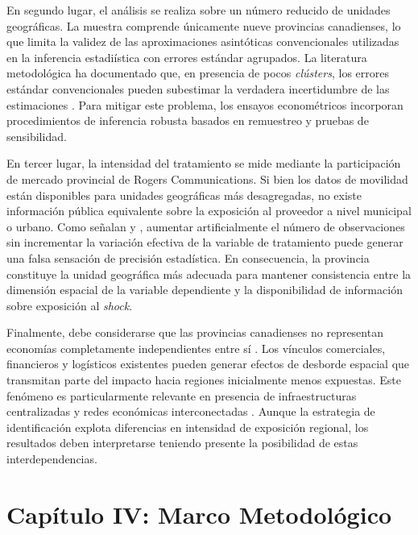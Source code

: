 En segundo lugar, el an\'alisis se realiza sobre un n\'umero reducido de unidades 
geogr\'aficas. La muestra comprende \'unicamente nueve provincias canadienses, lo 
que limita la validez de las aproximaciones asint\'oticas convencionales 
utilizadas en la inferencia estadi\'istica con errores est\'andar agrupados. La 
literatura metodol\'ogica ha documentado que, en presencia de pocos 
\textit{cl\'usters}, los errores est\'andar convencionales pueden subestimar la 
verdadera incertidumbre de las estimaciones \citep{cameron2006robust, ferman2019inference, mackinnon2020randomization}. Para mitigar este problema, los ensayos econom\'etricos incorporan procedimientos de inferencia robusta basados en remuestreo y pruebas de sensibilidad.

En tercer lugar, la intensidad del tratamiento se mide mediante la 
participaci\'on de mercado provincial de Rogers Communications. Si bien los 
datos de movilidad est\'an disponibles para unidades geogr\'aficas m\'as 
desagregadas, no existe informaci\'on p\'ublica equivalente sobre la exposici\'on 
al proveedor a nivel municipal o urbano. Como se\~nalan \cite{moulton1990aggregate} y 
\cite{angrist2009mostly}, aumentar artificialmente el n\'umero de observaciones sin 
incrementar la variaci\'on efectiva de la variable de tratamiento puede generar 
una falsa sensaci\'on de precisi\'on estad\'istica. En consecuencia, la 
provincia constituye la unidad geogr\'afica m\'as adecuada para mantener 
consistencia entre la dimensi\'on espacial de la variable dependiente y la 
disponibilidad de informaci\'on sobre exposici\'on al \textit{shock}.

Finalmente, debe considerarse que las provincias canadienses no representan 
econom\'ias completamente independientes entre s\'i \citep{jackson2010social}. Los v\'inculos comerciales, financieros y log\'isticos existentes pueden generar efectos de desborde espacial que transmitan parte del impacto hacia regiones inicialmente menos expuestas. Este fen\'omeno es particularmente relevante en presencia de infraestructuras 
centralizadas y redes econ\'omicas interconectadas \citep{anselin1988spatial, 
acemoglu2012network, carvalho2014micro}. Aunque la estrategia de identificaci\'on explota 
diferencias en intensidad de exposici\'on regional, los resultados deben 
interpretarse teniendo presente la posibilidad de estas interdependencias.

\newpage
\section{Cap\'itulo IV: Marco Metodol\'ogico}

